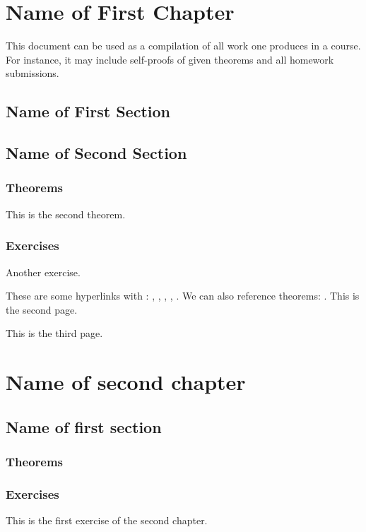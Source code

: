 \documentclass[11pt, a4paper]{book}
\begin{document}
\frontmatter
%

%
\tableofcontents
\thispagestyle{empty}
\newpage
\setcounter{page}{1}
%
\mainmatter
\chapter{Name of First Chapter}
This document can be used as a compilation of all work one produces in a course. For instance, it may include self-proofs of given theorems and all homework submissions.
%
\section{Name of First Section}
%
\section{Name of Second Section}
\subsection{Theorems}
\begin{theorem}
    This is the second theorem.
\end{theorem}
\subsection{Exercises}
\begin{exercise}\label{ex:1.2}
    Another exercise.
\end{exercise}
These are some hyperlinks with : , , , , . We can also reference theorems: . 
\newpage
This is the second page.

\newpage
This is the third page.
%
%
\chapter{Name of second chapter}
%
\section{Name of first section}
\subsection{Theorems}
\subsection{Exercises}
\begin{exercise}
    This is the first exercise of the second chapter.
\end{exercise}
\backmatter
\end{document}
